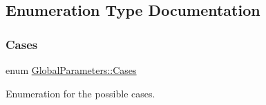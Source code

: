\subsection{Enumeration Type Documentation}
\mbox{\label{namespaceGlobalParameters_adde04e4243b82e3d4bd2f82d37a2d6bf}} 
\subsubsection{\texorpdfstring{Cases}{Cases}}
{\footnotesize\ttfamily enum \hyperlink{namespaceGlobalParameters_adde04e4243b82e3d4bd2f82d37a2d6bf}{Global\+Parameters\+::\+Cases}}



Enumeration for the possible cases. 

